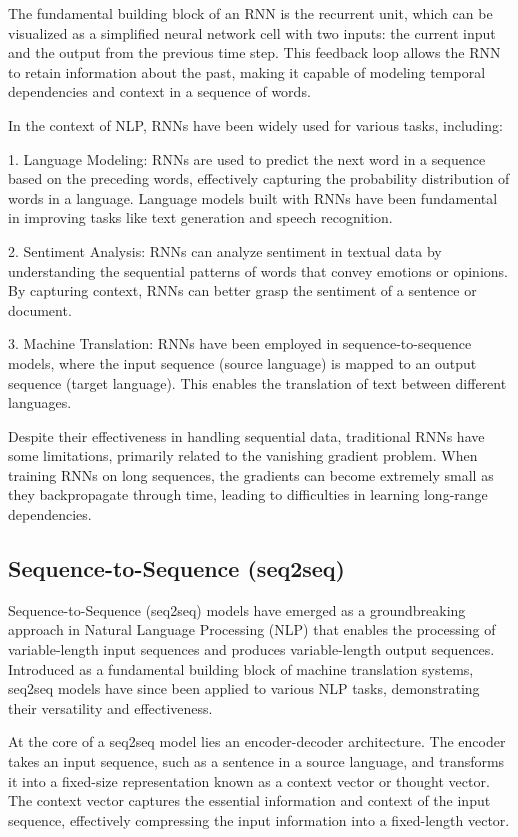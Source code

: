 \documentclass{article}
\begin{document}
The fundamental building block of an RNN is the recurrent unit, which can be visualized as a simplified neural network cell with two inputs: the current input and the output from the previous time step. This feedback loop allows the RNN to retain information about the past, making it capable of modeling temporal dependencies and context in a sequence of words.

In the context of NLP, RNNs have been widely used for various tasks, including:

1. Language Modeling: RNNs are used to predict the next word in a sequence based on the preceding words, effectively capturing the probability distribution of words in a language. Language models built with RNNs have been fundamental in improving tasks like text generation and speech recognition.

2. Sentiment Analysis: RNNs can analyze sentiment in textual data by understanding the sequential patterns of words that convey emotions or opinions. By capturing context, RNNs can better grasp the sentiment of a sentence or document.

3. Machine Translation: RNNs have been employed in sequence-to-sequence models, where the input sequence (source language) is mapped to an output sequence (target language). This enables the translation of text between different languages.

Despite their effectiveness in handling sequential data, traditional RNNs have some limitations, primarily related to the vanishing gradient problem. When training RNNs on long sequences, the gradients can become extremely small as they backpropagate through time, leading to difficulties in learning long-range dependencies.


\subsection{Sequence-to-Sequence (seq2seq)}

Sequence-to-Sequence (seq2seq) models have emerged as a groundbreaking approach in Natural Language Processing (NLP) that enables the processing of variable-length input sequences and produces variable-length output sequences. Introduced as a fundamental building block of machine translation systems, seq2seq models have since been applied to various NLP tasks, demonstrating their versatility and effectiveness.

At the core of a seq2seq model lies an encoder-decoder architecture. The encoder takes an input sequence, such as a sentence in a source language, and transforms it into a fixed-size representation known as a context vector or thought vector. The context vector captures the essential information and context of the input sequence, effectively compressing the input information into a fixed-length vector.
\end{document}
